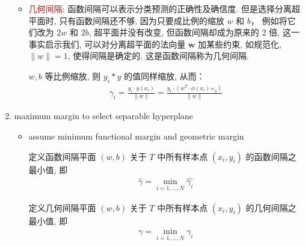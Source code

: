 \documentclass[oneside, 12pt]{ctexbook}
\begin{document}
\begin{enumerate}
\begin{itemize}
							\item \textcolor{red}{几何间隔}: 函数间隔可以表示分类预测的正确性及确信度. 但是选择分离超平面时, 只有函数间隔还不够, 因为只要成比例的缩放 $w$ 和 $b$， 例如将它们改为 $2w$ 和 $2b$, 超平面并没有改变, 但函数间隔却成为原来的 2 倍, 这一事实启示我们, 可以对分离超平面的法向量 $\boldsymbol{w}$ 加某些约束, 如规范化, $\parallel w \parallel = 1$, 使得间隔是确定的. 这是函数间隔称为几何间隔.
							
							$w, b$ 等比例缩放, 则 $y_i*y$ 的值同样缩放, 从而：
							\begin{align}
								\gamma_i = \frac{y_i \cdot y(x_i)}{\parallel w \parallel} =
								\frac{y_i \cdot (w^T \cdot \phi(x_i) +_b)}{\parallel w \parallel}
							\end{align}
						\end{itemize}
					
					\item maximum margin to select separable hyperplane
						\begin{itemize}
							\item assume minimum functional margin and geometric margin 
							
								定义函数间隔平面 $(w, b)$ 关于 $T$ 中所有样本点 $(x_i, y_i)$ 的函数间隔之最小值, 即
								\begin{align}
								\hat{\gamma} = \min\limits_{i=1,...,N} \hat{\gamma_i}
								\end{align}
								
								定义几何间隔平面 $(w, b)$ 关于 $T$ 中所有样本点 $(x_i, y_i)$ 的几何间隔之最小值, 即
								\begin{align}
									\gamma = \min\limits_{i=1,...,N} \gamma_i
								\end{align}
							

\end{itemize}
\end{enumerate}
\end{document}
